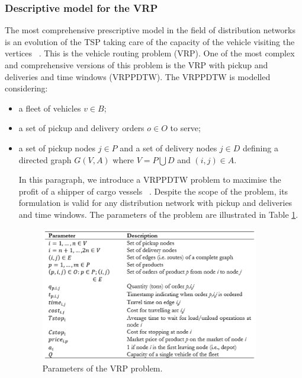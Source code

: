 \subsubsection{Descriptive model for the VRP}
The most comprehensive prescriptive model in the field of distribution networks is an evolution of the TSP taking care of the capacity of the vehicle visiting the vertices ~\cite{Accorsi2017d}. This is the vehicle routing problem (VRP). One of the most complex and comprehensive versions of this problem is the VRP with pickup and deliveries and time windows (VRPPDTW). The VRPPDTW is modelled considering:
\begin{itemize}
    \item a fleet of vehicles $v\in B$;
	\item a set of pickup and delivery orders $o\in O$ to serve;
	\item a set of pickup nodes $j\in P$ and a set of delivery nodes $j\in D$ defining a directed graph $G\left(V,A\right)$ where $V=P\bigcup D$ and $\left(i,j\right)\in A$.
	
In this paragraph, we introduce a VRPPDTW problem to maximise the profit of a shipper of cargo vessels ~\cite{Accorsi2018}. Despite the scope of the problem, its formulation is valid for any distribution network with pickup and deliveries and time windows. The parameters of the problem are illustrated in Table \ref{tab_VRP_vessels}.

\begin{figure}[hbt!]
\centering
\includegraphics[width=0.9\textwidth]{SectionDistribution/control_figures/tab_VRP_vessels.png}
\captionsetup{type=table}
\caption{Parameters of the VRP problem.}
\label{tab_VRP_vessels}
\end{figure}

\end{itemize}

